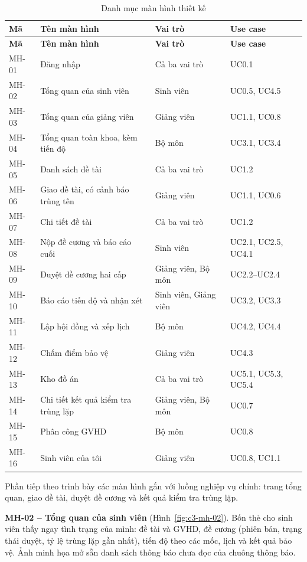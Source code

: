 \documentclass[../main.tex]{subfiles}
\begin{document}
{\renewcommand{\arraystretch}{1.15}
\small
\begin{longtable}{|p{1.6cm}|p{6.5cm}|p{3.5cm}|p{2.6cm}|}
\caption{Danh mục màn hình thiết kế}\label{tab:c3-man-hinh}\\
\hline
\textbf{Mã} & \textbf{Tên màn hình} & \textbf{Vai trò} & \textbf{Use case} \\
\hline
\endfirsthead
\hline
\textbf{Mã} & \textbf{Tên màn hình} & \textbf{Vai trò} & \textbf{Use case} \\
\hline
\endhead
MH-01 & Đăng nhập & Cả ba vai trò & UC0.1 \\
\hline
MH-02 & Tổng quan của sinh viên & Sinh viên & UC0.5, UC4.5 \\
\hline
MH-03 & Tổng quan của giảng viên & Giảng viên & UC1.1, UC0.8 \\
\hline
MH-04 & Tổng quan toàn khoa, kèm tiến độ & Bộ môn & UC3.1, UC3.4 \\
\hline
MH-05 & Danh sách đề tài & Cả ba vai trò & UC1.2 \\
\hline
MH-06 & Giao đề tài, có cảnh báo trùng tên & Giảng viên & UC1.1, UC0.6 \\
\hline
MH-07 & Chi tiết đề tài & Cả ba vai trò & UC1.2 \\
\hline
MH-08 & Nộp đề cương và báo cáo cuối & Sinh viên & UC2.1, UC2.5, UC4.1 \\
\hline
MH-09 & Duyệt đề cương hai cấp & Giảng viên, Bộ môn & UC2.2--UC2.4 \\
\hline
MH-10 & Báo cáo tiến độ và nhận xét & Sinh viên, Giảng viên & UC3.2, UC3.3 \\
\hline
MH-11 & Lập hội đồng và xếp lịch & Bộ môn & UC4.2, UC4.4 \\
\hline
MH-12 & Chấm điểm bảo vệ & Giảng viên & UC4.3 \\
\hline
MH-13 & Kho đồ án & Cả ba vai trò & UC5.1, UC5.3, UC5.4 \\
\hline
MH-14 & Chi tiết kết quả kiểm tra trùng lặp & Giảng viên, Bộ môn & UC0.7 \\
\hline
MH-15 & Phân công GVHD & Bộ môn & UC0.8 \\
\hline
MH-16 & Sinh viên của tôi & Giảng viên & UC0.8, UC1.1 \\
\hline
\end{longtable}
}

Phần tiếp theo trình bày các màn hình gắn với luồng nghiệp vụ chính: trang tổng quan, giao đề tài, duyệt đề cương và kết quả kiểm tra trùng lặp.

\textbf{MH-02 -- Tổng quan của sinh viên} (Hình~\ref{fig:c3-mh-02}). Bốn thẻ cho sinh viên thấy ngay tình trạng của mình: đề tài và GVHD, đề cương (phiên bản, trạng thái duyệt, tỷ lệ trùng lặp gần nhất), tiến độ theo các mốc, lịch và kết quả bảo vệ. Ảnh minh họa mở sẵn danh sách thông báo chưa đọc của chuông thông báo.
\end{document}
